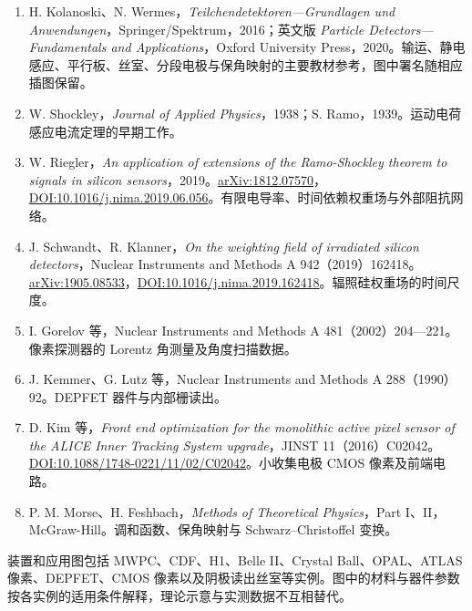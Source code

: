 \documentclass[
  11pt,
  a4paper,
  oneside,
  openany]{report}
\providecommand{\tightlist}{%
  \setlength{\itemsep}{0pt}\setlength{\parskip}{0pt}}
\numberwithin{equation}{chapter}
\begin{document}
\begin{enumerate}
\def\labelenumi{\arabic{enumi}.}
\tightlist
\item
  H. Kolanoski、N. Wermes，\emph{Teilchendetektoren---Grundlagen und
  Anwendungen}，Springer/Spektrum，2016；英文版 \emph{Particle
  Detectors---Fundamentals and Applications}，Oxford University
  Press，2020。输运、静电感应、平行板、丝室、分段电极与保角映射的主要教材参考，图中署名随相应插图保留。
\item
  W. Shockley，\emph{Journal of Applied Physics}，1938；S.
  Ramo，1939。运动电荷感应电流定理的早期工作。
\item
  W. Riegler，\emph{An application of extensions of the Ramo-Shockley
  theorem to signals in silicon
  sensors}，2019。\href{https://arxiv.org/abs/1812.07570}{arXiv:1812.07570}，\href{https://doi.org/10.1016/j.nima.2019.06.056}{DOI:10.1016/j.nima.2019.06.056}。有限电导率、时间依赖权重场与外部阻抗网络。
\item
  J. Schwandt、R. Klanner，\emph{On the weighting field of irradiated
  silicon detectors}，Nuclear Instruments and Methods A
  942（2019）162418。\href{https://arxiv.org/abs/1905.08533}{arXiv:1905.08533}，\href{https://doi.org/10.1016/j.nima.2019.162418}{DOI:10.1016/j.nima.2019.162418}。辐照硅权重场的时间尺度。
\item
  I. Gorelov 等，Nuclear Instruments and Methods A
  481（2002）204---221。像素探测器的 Lorentz 角测量及角度扫描数据。
\item
  J. Kemmer、G. Lutz 等，Nuclear Instruments and Methods A
  288（1990）92。DEPFET 器件与内部栅读出。
\item
  D. Kim 等，\emph{Front end optimization for the monolithic active
  pixel sensor of the ALICE Inner Tracking System upgrade}，JINST
  11（2016）C02042。\href{https://doi.org/10.1088/1748-0221/11/02/C02042}{DOI:10.1088/1748-0221/11/02/C02042}。小收集电极
  CMOS 像素及前端电路。
\item
  P. M. Morse、H. Feshbach，\emph{Methods of Theoretical Physics}，Part
  I、II，McGraw-Hill。调和函数、保角映射与 Schwarz--Christoffel 变换。
\end{enumerate}

装置和应用图包括 MWPC、CDF、H1、Belle II、Crystal Ball、OPAL、ATLAS
像素、DEPFET、CMOS
像素以及阴极读出丝室等实例。图中的材料与器件参数按各实例的适用条件解释，理论示意与实测数据不互相替代。
\end{document}
